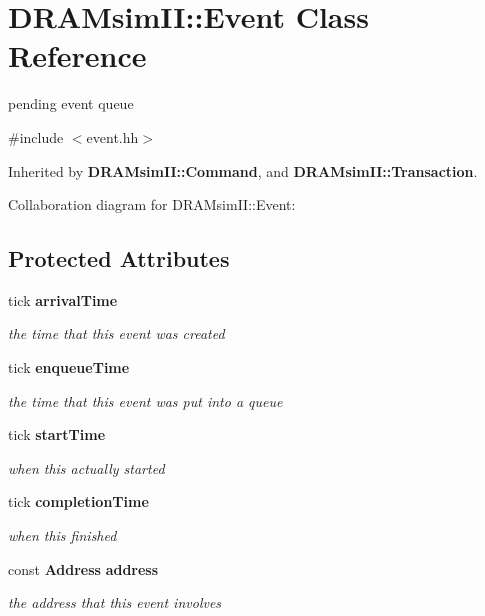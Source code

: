 \section{DRAMsimII::Event Class Reference}
\label{class_d_r_a_msim_i_i_1_1_event}


pending event queue  




{\ttfamily \#include $<$event.hh$>$}



Inherited by {\bf DRAMsimII::Command}, and {\bf DRAMsimII::Transaction}.



Collaboration diagram for DRAMsimII::Event:\subsection*{Protected Attributes}
\begin{DoxyCompactItemize}
\item 
tick {\bf arrivalTime}\label{class_d_r_a_msim_i_i_1_1_event_a5eae270c205a02b2fb28d11ab84a6ed9}

\begin{DoxyCompactList}\small\item\em the time that this event was created \item\end{DoxyCompactList}\item 
tick {\bf enqueueTime}\label{class_d_r_a_msim_i_i_1_1_event_a55cd17fa82ce4031824037df59dc50d3}

\begin{DoxyCompactList}\small\item\em the time that this event was put into a queue \item\end{DoxyCompactList}\item 
tick {\bf startTime}\label{class_d_r_a_msim_i_i_1_1_event_a9f6b444813bf6568040678e0d8139d44}

\begin{DoxyCompactList}\small\item\em when this actually started \item\end{DoxyCompactList}\item 
tick {\bf completionTime}\label{class_d_r_a_msim_i_i_1_1_event_a2a6e865d555bcde6264e8726edc95b38}

\begin{DoxyCompactList}\small\item\em when this finished \item\end{DoxyCompactList}\item 
const {\bf Address} {\bf address}\label{class_d_r_a_msim_i_i_1_1_event_a6aa0830ccf3c9f103bc6dfaab1919562}

\begin{DoxyCompactList}\small\item\em the address that this event involves \item\end{DoxyCompactList}\end{DoxyCompactItemize}


